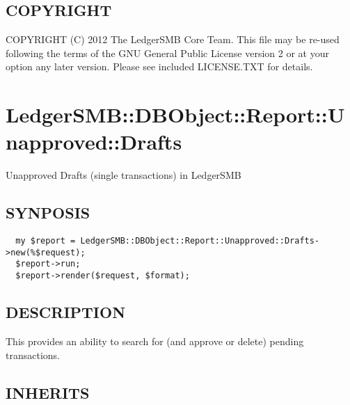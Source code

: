 \begin{description}
\begin{description}
\begin{description}
\begin{description}
\begin{description}
\begin{description}
\begin{description}
\begin{description}
\begin{description}
\begin{description}
\begin{description}
\end{description}
\subsection*{COPYRIGHT\label{LedgerSMB::DBObject::Report::Unapproved::Batch_Overview_COPYRIGHT}}


COPYRIGHT (C) 2012 The LedgerSMB Core Team.  This file may be re-used following
the terms of the GNU General Public License version 2 or at your option any
later version.  Please see included LICENSE.TXT for details.

\section{LedgerSMB::DBObject::Report::Unapproved::Drafts\label{LedgerSMB::DBObject::Report::Unapproved::Drafts}}


Unapproved Drafts (single 
transactions) in LedgerSMB

\subsection*{SYNPOSIS\label{LedgerSMB::DBObject::Report::Unapproved::Drafts_SYNPOSIS}}
\begin{verbatim}
  my $report = LedgerSMB::DBObject::Report::Unapproved::Drafts->new(%$request);
  $report->run;
  $report->render($request, $format);
\end{verbatim}
\subsection*{DESCRIPTION\label{LedgerSMB::DBObject::Report::Unapproved::Drafts_DESCRIPTION}}


This provides an ability to search for (and approve or delete) pending
transactions.

\subsection*{INHERITS\label{LedgerSMB::DBObject::Report::Unapproved::Drafts_INHERITS}}
\begin{description}


\end{description}
\end{description}
\end{description}
\end{description}
\end{description}
\end{description}
\end{description}
\end{description}
\end{description}
\end{description}
\end{description}
